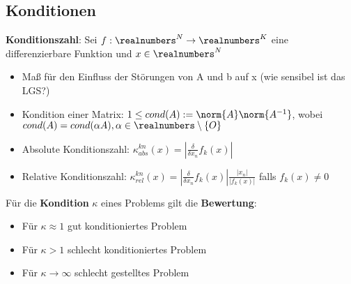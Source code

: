 \subsection{Konditionen}%
\label{gl:sub:konditionen}
\textbf{Konditionszahl}:
Sei $f: \realnumbers^N \rightarrow \realnumbers^K$ eine differenzierbare Funktion und $x \in \realnumbers^N$
\begin{itemize}
	\item Maß für den Einfluss der Störungen von A und b auf x (wie sensibel ist das LGS?)
	\item Kondition einer Matrix: $1 \leq cond(A) := \norm{A}\norm{A^{-1}}$, wobei $cond(A) = cond(\alpha A), \alpha\in\realnumbers\setminus\{O\}$
	\item Absolute Konditionszahl: $\kappa^{kn}_{abs}(x) = |\frac{\delta}{\delta x_n}f_k(x)|$
	\item Relative Konditionszahl: $\kappa^{kn}_{rel}(x) = |\frac{\delta}{\delta x_n}f_k(x)| \frac{|x_n|}{|f_k(x)|}$ falls $f_k(x) \neq 0$
\end{itemize}
    Für die \textbf{Kondition} $\kappa$ eines Problems gilt die \textbf{Bewertung}:
    \begin{itemize}
            \item Für $\kappa \approx 1$ gut konditioniertes Problem
            \item Für $\kappa > 1$ schlecht konditioniertes Problem
            \item Für $\kappa \rightarrow \infty$ schlecht gestelltes Problem
    \end{itemize}

\newpage
